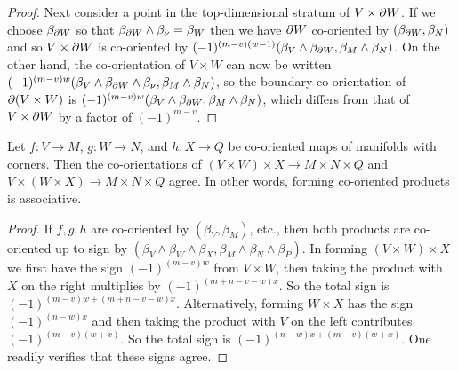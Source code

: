 \begin{proof}
	Next consider a point in the top-dimensional stratum of $V \times \partial W$.
	If we choose $\beta_{\partial W}$ so that $\beta_{\partial W} \wedge \beta_\nu = \beta_W$ then we have $\partial W$ co-oriented by $(\beta_{\partial W},\beta_N)$ and so $V \times \partial W$ is co-oriented by $(-1)^{(m-v)(w-1)}(\beta_{V} \wedge \beta_{\partial W},\beta_M \wedge \beta_N)$.
	On the other hand, the co-orientation of $V \times W$ can now be written $(-1)^{(m-v)w}(\beta_{V} \wedge \beta_{\partial W} \wedge \beta_\nu,\beta_M \wedge \beta_N)$, so the boundary co-orientation of $\partial(V \times W)$ is $(-1)^{(m-v)w}(\beta_{V} \wedge \beta_{\partial W},\beta_{M} \wedge \beta_N)$, which differs from that of $V \times \partial W$ by a factor of $(-1)^{m-v}$.
\end{proof}

\begin{proposition}\label{P: exterior associativity}
	Let $f \colon V \to M$, $g \colon W \to N$, and $h \colon X \to Q$ be co-oriented maps of manifolds with corners.
	Then the co-orientations of $(V \times W) \times X \to M \times N \times Q$ and $V \times (W \times X) \to M \times N \times Q$ agree.
	In other words, forming co-oriented products is associative.
\end{proposition}

\begin{proof}
	If $f,g,h$ are co-oriented by $(\beta_V,\beta_M)$, etc., then both products are co-oriented up to sign by $(\beta_V \wedge \beta_W \wedge \beta_X,\beta_M \wedge \beta_N \wedge \beta_P)$.
	In forming $(V \times W) \times X$ we first have the sign $(-1)^{(m-v)w}$ from $V \times W$, then taking the product with $X$ on the right multiplies by $(-1)^{(m+n-v-w)x}$.
	So the total sign is $(-1)^{(m-v)w+(m+n-v-w)x}$.
	Alternatively, forming $W \times X$ has the sign $(-1)^{(n-w)x}$ and then taking the product with $V$ on the left contributes $(-1)^{(m-v)(w+x)}$.
	So the total sign is $(-1)^{(n-w)x+(m-v)(w+x)}$.
	One readily verifies that these signs agree.
\end{proof}

\begin{comment}
	Dev and Anibal, please check the following arguments carefully as I'm not 100\% confident in it.
	It gives the ``right'' answer but I'm a little uncomfortable divorcing the order of the orientation terms from the order of the manifold terms.
	Of course this happens all the time - even if we think of $\R^2$ as $\R_x \oplus \R_y$ we can still think about the two-form $y \wedge x$, but I'm still a little nervous about maybe having missed a sign somewhere.
	I'm also a little nervous about my trick of taking $a$ and $b$ to be even so that they won't contribute, but the earlier work says that this should be allowable.
	Presumably if I didn't do this there would be a bunch of extra signs that miraculous cancel out, but I'm not so excited about trying that out in detail to see.
\end{comment}


